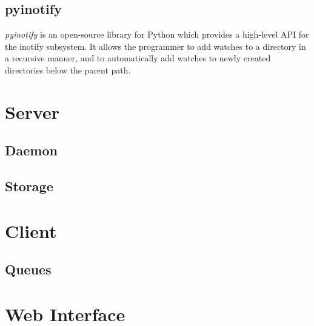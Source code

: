 \subsection{pyinotify}

\emph{pyinotify} is an open-source library for Python which provides
a high-level API for the inotify subsystem. It allows the programmer to add
watches to a directory in a recursive manner, and to automatically add watches
to newly created directories below the parent path.

\section{Server}

\subsection{Daemon}

\subsection{Storage}

\section{Client}

\subsection{Queues}

\section{Web Interface}
\label{sec:impl-web-interface}
